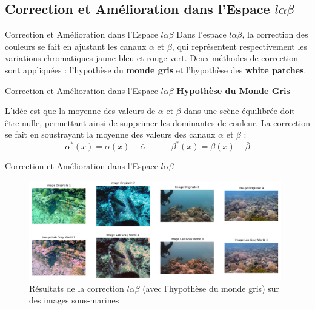 \documentclass[8pt,a4paper]{beamer}
\numberwithin{figure}{section}
\begin{document}
\subsection{Correction et Amélioration dans l'Espace \( l\alpha\beta \)}
\begin{frame}{Correction et Amélioration dans l'Espace \( l\alpha\beta \)}
Dans l'espace \( l\alpha\beta \), la correction des couleurs se fait en ajustant les canaux \( \alpha \) et \( \beta \), qui représentent respectivement les variations chromatiques jaune-bleu et rouge-vert. Deux méthodes de correction sont appliquées : l'hypothèse du \textbf{monde gris} et l'hypothèse des \textbf{white patches}.

\end{frame}

\begin{frame}{Correction et Amélioration dans l'Espace \( l\alpha\beta \)}
\textbf{Hypothèse du Monde Gris}
\vspace{3mm}
\par L'idée est que la moyenne des valeurs de \( \alpha \) et \( \beta \) dans une scène équilibrée doit être nulle, permettant ainsi de supprimer les dominantes de couleur. La correction se fait en soustrayant la moyenne des valeurs des canaux \( \alpha \) et \( \beta \) :
   \[
   \alpha^*(x) = \alpha(x) - \bar{\alpha} \quad\quad\quad \beta^*(x) = \beta(x) - \bar{\beta}
   \]
\end{frame}

\begin{frame}{Correction et Amélioration dans l'Espace \( l\alpha\beta \)}
\begin{figure}[h!]
\begin{center}
\includegraphics[width=11cm]{image006.png}
\end{center}
\label{figure3.1}
\caption{Résultats de la correction $l\alpha\beta$ (avec l'hypothèse du monde gris) sur des images sous-marines}
\end{figure}
\end{frame}
\end{document}
